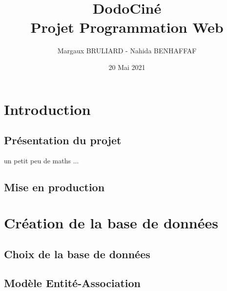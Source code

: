 \documentclass[a4paper, 11pt]{MyReport}
\author{Margaux BRULIARD - Nahida BENHAFFAF}
\title{DodoCiné \\ \vspace*{0.5cm}Projet Programmation Web}
\date{20 Mai 2021}
\begin{document}
	\begin{printTitle}
	\end{printTitle}

	\tableofcontents
	\newpage

	\chapter*{Introduction}
		
		\section*{Présentation du projet}

		un petit peu de maths ... 

		\section*{Mise en production}


	\chapter{Création de la base de données}

		\section{Choix de la base de données}
			
		\section{Modèle Entité-Association}


\end{document}
